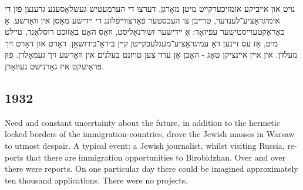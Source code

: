 \documentclass{article}
\begin{document}
\begin{pairs}

\begin{Rightside}

\begin{RTL}
\begin{hebrew}
\beginnumbering

\autopar

נויט און אײביקע אומזיכערקײט מיטן מאָרגן, דערצו די הערמעטיש געשלאָסענע
גרענצן פֿון די אימיגראַציע־לענדער, טרײבן צו העכסטער פֿאַרצװײפֿלונג די ײדישע מאַסן אין װאַרשע.
אַ כאַראַקטעריסטישער עפּיזאָד:
אַ ײדישער זשורנאַליסט, װאָס האָט באַזוכט רוסלאַנד, טײלט מיט, אַז עס זײנען דאָ
עמיגראַציע־מעגלעכקײטן קײן ביראָ־בידזשאַן. דאָרט און דאָרט זיך מעלדן.
אין אײן אײנציקן טאָג - האָבן אַן ערד צען טויזנט בעלנים אין װאַרשע זיך געמאָלדן. פֿוּן פּראָיעקט איז גאָרנישט געװאָרן.

\endnumbering
\end{hebrew}
\end{RTL}
\end{Rightside}


\begin{Leftside}
\begin{english}
\section{ 1932  }
\beginnumbering
\autopar

Need and constant uncertainty about the future, in addition to the hermetic locked borders of the immigration-countries, 
drove the Jewish masses in Warsaw to utmost despair. A typical event: a Jewish journalist, whilst visiting Russia,
reports that there are immigration opportunities  to Birobidzhan. Over and over there were reports. On one particular
day there could be imagined approximately ten thousand applications. There were no projects.

\endnumbering
\end{english}
\end{Leftside}
\end{pairs}
\Columns
\end{document}
